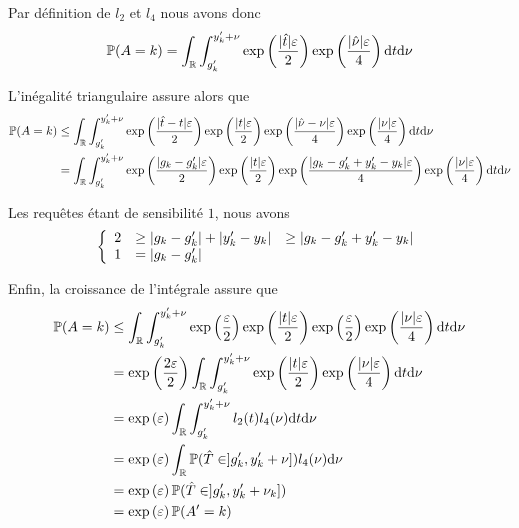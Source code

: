 Par définition de \(l_2\) et \(l_4\) nous avons donc
\begin{align*}
    \mathbb P(A = k) & =  \int_{\mathbb{R}}\int_{g_k'}^{y_k' + \nu } \exp\left(\dfrac{|\hat t|\varepsilon}{2}\right)\exp\left(\dfrac{|\hat\nu|\varepsilon}{4}\right) \mathrm{d} t \mathrm{d} \nu\\
\end{align*}

L'inégalité triangulaire assure alors que 
\begin{align*}
    \mathbb P(A = k) & \leq  \int_{\mathbb{R}}\int_{g_k'}^{y_k' + \nu } \exp\left(\dfrac{|\hat t - t|\varepsilon}{2}\right)\exp\left(\dfrac{|t|\varepsilon}{2}\right)\exp\left(\dfrac{|\hat\nu - \nu|\varepsilon}{4}\right)\exp\left(\dfrac{|\nu|\varepsilon}{4}\right) \mathrm{d} t \mathrm{d} \nu\\
    & =  \int_{\mathbb{R}}\int_{g_k'}^{y_k' + \nu } \exp\left(\dfrac{| g_k - g_k' |\varepsilon}{2}\right)\exp\left(\dfrac{|t|\varepsilon}{2}\right)\exp\left(\dfrac{|g_k - g_k' + y_k' - y_k |\varepsilon}{4}\right)\exp\left(\dfrac{|\nu|\varepsilon}{4}\right) \mathrm{d}  t \mathrm{d} \nu\\
\end{align*}

Les requêtes étant de sensibilité \(1\), nous avons 
\[
    \left\{ 
        \begin{array}[]{rlc}
            2 & \geq |g_k - g_k'| + |y_k' - y_k | & \geq|g_k - g_k' + y_k' - y_k | \\
            1 & = | g_k - g_k' | \\
        \end{array}
    \right.    
\]

Enfin, la croissance de l'intégrale assure que 
\begin{align*}
    \mathbb P(A = k) & \leq  \int_{\mathbb{R}}\int_{g_k'}^{y_k' + \nu } \exp\left(\dfrac{\varepsilon}{2}\right)\exp\left(\dfrac{|t|\varepsilon}{2}\right)\exp\left(\dfrac{\varepsilon}{2}\right)\exp\left(\dfrac{|\nu|\varepsilon}{4}\right) \mathrm{d}  t \mathrm{d} \nu\\
    & = \exp\left(\dfrac{2\varepsilon}{2}\right)  \int_{\mathbb{R}}\int_{g_k'}^{y_k' + \nu }\exp\left(\dfrac{|t|\varepsilon}{2}\right)\exp\left(\dfrac{|\nu|\varepsilon}{4}\right) \mathrm{d}  t \mathrm{d} \nu\\
    & = \exp\left(\varepsilon\right) \int_{\mathbb{R}}\int_{g_k'}^{y_k' + \nu }l_2(t)l_4(\nu) \mathrm{d}  t \mathrm{d} \nu\\
    & = \exp\left(\varepsilon\right) \int_{\mathbb{R}} \mathbb P(\hat T \in ]g_k', y_k' + \nu]) l_4(\nu) \mathrm{d} \nu\\
    & = \exp\left(\varepsilon\right) \mathbb P(\hat T \in ]g_k', y_k' + \nu_k]) \\
    & = \exp\left(\varepsilon\right) \mathbb P(A' = k)
\end{align*}





